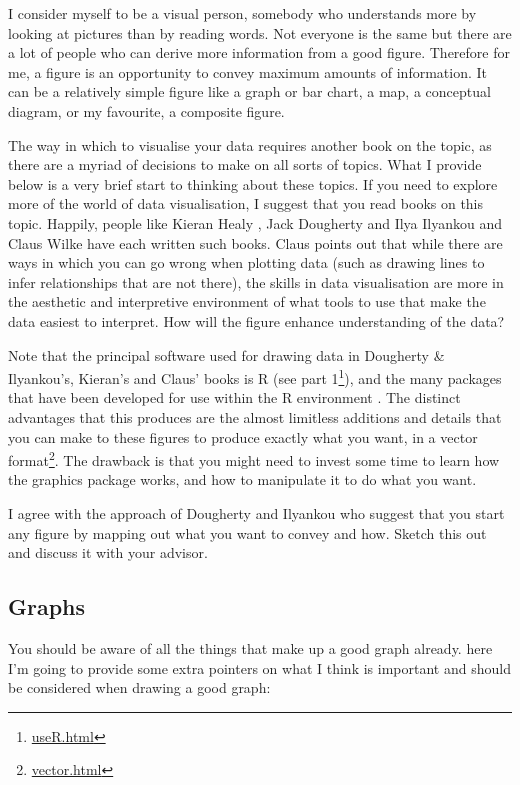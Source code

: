\documentclass[
]{krantz}
\renewcommand{\href}[2]{#2\footnote{\url{#1}}}
\begin{document}
I consider myself to be a visual person, somebody who understands more by looking at pictures than by reading words. Not everyone is the same but there are a lot of people who can derive more information from a good figure. Therefore for me, a figure is an opportunity to convey maximum amounts of information. It can be a relatively simple figure like a graph or bar chart, a map, a conceptual diagram, or my favourite, a composite figure.

The way in which to visualise your data requires another book on the topic, as there are a myriad of decisions to make on all sorts of topics. What I provide below is a very brief start to thinking about these topics. If you need to explore more of the world of data visualisation, I suggest that you read books on this topic. Happily, people like Kieran Healy \citeyearpar{healy2018data}, Jack Dougherty and Ilya Ilyankou \citeyearpar{dougherty2021hands-on} and Claus Wilke \citeyearpar{wilke2019fundamentals} have each written such books. Claus points out that while there are ways in which you can go wrong when plotting data (such as drawing lines to infer relationships that are not there), the skills in data visualisation are more in the aesthetic and interpretive environment of what tools to use that make the data easiest to interpret. How will the figure enhance understanding of the data?

Note that the principal software used for drawing data in Dougherty \& Ilyankou's, Kieran's and Claus' books is R (\href{useR.html}{see part 1}), and the many packages that have been developed for use within the R environment \citep{rcoreteam2021r}. The distinct advantages that this produces are the almost limitless additions and details that you can make to these figures to produce exactly what you want, in a \href{vector.html}{vector format}. The drawback is that you might need to invest some time to learn how the graphics package works, and how to manipulate it to do what you want.

I agree with the approach of Dougherty and Ilyankou \citeyearpar{dougherty2021hands-on} who suggest that you start any figure by mapping out what you want to convey and how. Sketch this out and discuss it with your advisor.

\hypertarget{graphs}{%
\subsection{Graphs}\label{graphs}}

You should be aware of all the things that make up a good graph already. here I'm going to provide some extra pointers on what I think is important and should be considered when drawing a good graph:
\end{document}
